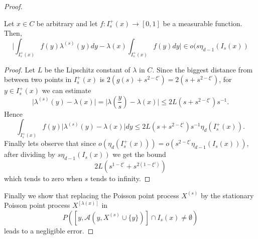 \begin{proof}
\begin{lem}\label{lem2.4} Let $x\in C$ be arbitrary and let $f:I^+_s(x)\rightarrow[0,1]$ be a measurable function. Then, $$\vert \int_{I^+_s(x)}f(y)\lambda^{(s)}(y)dy-\lambda(x)\int_{I^+_s(x)}f(y)dy\vert\in o(s\eta_{d-1}(I_s(x)) $$
\end{lem}
\begin{proof}
Let $L$ be the Lipschitz constant of $\lambda$ in $C$. Since the biggest distance from between two points in $I_s^+(x)$ is $2(g(s)+s^{2-\xi'})=2(s+s^{2-\xi'})$, for $y\in I_s^+(x)$ we can estimate
$$\vert \lambda^{(s)}(y)-\lambda(x)\vert=\vert \lambda(\frac{y}{s})-\lambda(x)\vert\leq 2L(s+s^{2-\xi'})s^{-1}. $$ Hence $$\int_{I^+_s(x)}f(y)\vert\lambda^{(s)}(y)-\lambda(x)\vert dy \leq 2L(s+s^{2-\xi'})s^{-1}\eta_d(I^+_s(x)). $$ Finally lets observe that since $o(\eta_{d}(I^+_s(x)))=o(s^{2-\xi'}\eta_{d-1}(I_s(x)))$, after dividing by $s\eta_{d-1}(I_s(x))$ we get the bound
$$2L(s^{1-\xi'}+s^{2(1-\xi')})$$ which tends to zero when $s$ tends to infinity.
\end{proof}

Finally we show that replacing the Poisson point process $X^{(s)}$ by the stationary Poisson point process $X^{[\lambda(x)]}$ in $$P([y, \mathcal{A}(y,X^{(s)}\cup\lbrace y\rbrace)]\cap I_s(x)\neq \emptyset)$$ leads to a negligible error.


\end{proof}
